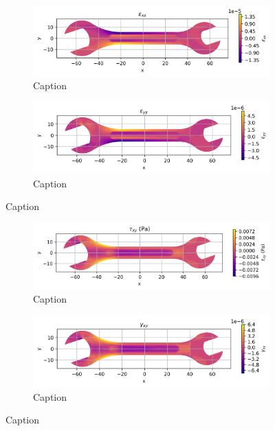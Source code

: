 \begin{figure}[H]
  \centering
  \begin{subfigure}[t]{0.49\textwidth}
    \centering
    \includegraphics[width=\textwidth]{GRAFICOS/Case d - epsilon_xx.png}
    \caption{Caption}
    \label{fig:deformada_reacciones}
  \end{subfigure}
  \hfill
  \begin{subfigure}[t]{0.49\textwidth}
    \centering
    \includegraphics[width=\textwidth]{GRAFICOS/Case d - epsilon_yy.png}
    \caption{Caption}
    \label{fig:von_mises}
  \end{subfigure}
  \caption{Caption}
  \label{fig:analisis_estructural}
\end{figure}

\begin{figure}[H]
  \centering
  \begin{subfigure}[t]{0.49\textwidth}
    \centering
    \includegraphics[width=\textwidth]{GRAFICOS/Case d - tau_xy.png}
    \caption{Caption}
    \label{fig:deformada_reacciones}
  \end{subfigure}
  \hfill
  \begin{subfigure}[t]{0.49\textwidth}
    \centering
    \includegraphics[width=\textwidth]{GRAFICOS/Case d - gamma_xy.png}
    \caption{Caption}
    \label{fig:von_mises}
  \end{subfigure}
  \caption{Caption}
  \label{fig:analisis_estructural}
\end{figure}

